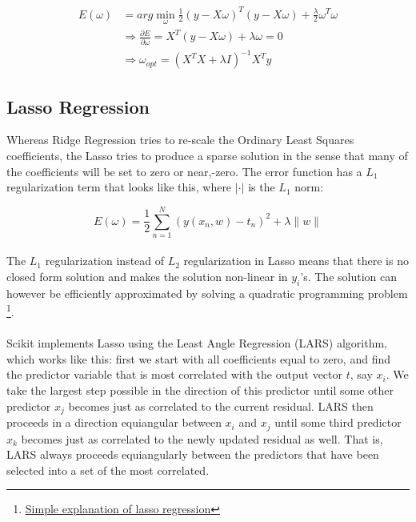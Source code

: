 \documentclass[letterpaper]{article}
\begin{document}
\begin{equation}
\begin{split}
E(\omega) &= arg \min_{\omega} \frac{1}{2} (y - X\omega)^{T} (y - X\omega) + \frac{\lambda}{2} \omega^{T} \omega \\
& \Rightarrow \frac{\partial E}{\partial \omega} = X^{T}(y-X\omega) + \lambda \omega = 0 \\
&\Rightarrow \omega_{opt} = (X^{T}X + \lambda I)^{-1} X^{T}y
\end{split}
\end{equation}

\subsection{Lasso Regression}
Whereas Ridge Regression tries to re-scale the Ordinary Least Squares coefficients, the Lasso tries to produce a sparse solution in the sense that many of the coefficients will be set to zero or near,-zero. The error function has a $L_1$ regularization term that looks like this, where $\lvert \cdot \rvert$ is the $L_1$ norm:

$$E(\omega) = \frac{1}{2} \sum_{n=1}^N (y(x_n,w) - t_n)^2 + \lambda \lVert w \rVert$$
\\
The $L_1$ regularization instead of $L_2$ regularization in Lasso means that there is no closed form solution and makes the solution non-linear in $y_i$'s. The solution can however be efficiently approximated by solving a quadratic programming problem \footnote{\href{http://statweb.stanford.edu/~tibs/lasso/simple.html}{Simple explanation of lasso regression}}. \\
\\
Scikit implements Lasso using the Least Angle Regression (LARS) algorithm, which works like this: first we start with all coefficients equal to zero, and find the predictor variable that is most correlated with the output vector $t$, say $x_i$. We take the largest step possible in the direction of this predictor until some other predictor $x_j$ becomes just as correlated to the current residual. LARS then proceeds in a direction equiangular between $x_i$ and $x_j$ until some third predictor $x_k$ becomes just as correlated to the newly updated residual as well. That is, LARS always proceeds equiangularly between the predictors that have been selected into a set of the most correlated.
\end{document}
